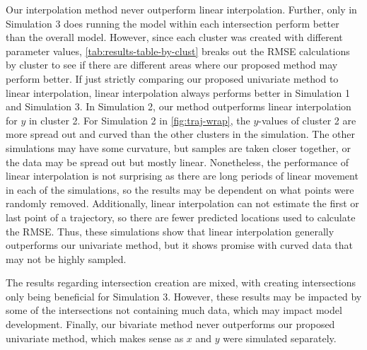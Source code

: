 \documentclass[12pt]{article}
\begin{document}
Our interpolation method never outperform linear interpolation. Further,
only in Simulation 3 does running the model within each intersection
perform better than the overall model. However, since each cluster was
created with different parameter values,
\cref{tab:results-table-by-clust} breaks out the RMSE calculations by
cluster to see if there are different areas where our proposed method
may perform better. If just strictly comparing our proposed univariate
method to linear interpolation, linear interpolation always performs
better in Simulation 1 and Simulation 3. In Simulation 2, our method
outperforms linear interpolation for \(y\) in cluster 2. For Simulation
2 in \cref{fig:traj-wrap}, the \(y\)-values of cluster 2 are more spread
out and curved than the other clusters in the simulation. The other
simulations may have some curvature, but samples are taken closer
together, or the data may be spread out but mostly linear. Nonetheless,
the performance of linear interpolation is not surprising as there are
long periods of linear movement in each of the simulations, so the
results may be dependent on what points were randomly removed.
Additionally, linear interpolation can not estimate the first or last
point of a trajectory, so there are fewer predicted locations used to
calculate the RMSE. Thus, these simulations show that linear
interpolation generally outperforms our univariate method, but it shows
promise with curved data that may not be highly sampled.

The results regarding intersection creation are mixed, with creating
intersections only being beneficial for Simulation 3. However, these
results may be impacted by some of the intersections not containing much
data, which may impact model development. Finally, our bivariate method
never outperforms our proposed univariate method, which makes sense as
\(x\) and \(y\) were simulated separately.
\end{document}
